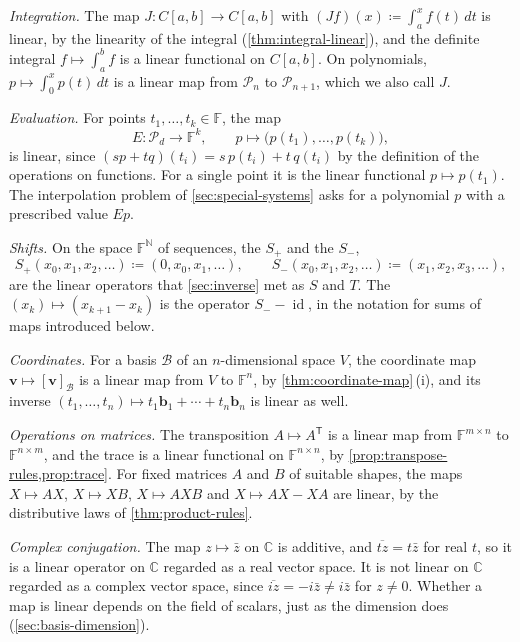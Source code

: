 \emph{Integration.} The map $J\colon C[a,b]\to C[a,b]$ with $(Jf)(x)\coloneqq\int_a^xf(t)\,dt$ is linear, by the linearity of the integral (\cref{thm:integral-linear}), and the definite integral $f\mapsto\int_a^bf$ is a linear functional on $C[a,b]$. On polynomials, $p\mapsto\int_0^xp(t)\,dt$ is a linear map from $\mathcal P_n$ to $\mathcal P_{n+1}$, which we also call $J$.

\emph{Evaluation.} For points $t_1,\ldots,t_k\in\mathbb F$, the map
\[
E\colon\mathcal P_d\to\mathbb F^k,\qquad p\mapsto\bigl(p(t_1),\ldots,p(t_k)\bigr),
\]
is linear, since $(sp+tq)(t_i)=s\,p(t_i)+t\,q(t_i)$ by the definition of the operations on functions. For a single point it is the linear functional $p\mapsto p(t_1)$. The interpolation problem of \cref{sec:special-systems} asks for a polynomial $p$ with a prescribed value $Ep$.

\emph{Shifts.} On the space $\mathbb F^{\mathbb N}$ of sequences, the  $S_+$ and the  $S_-$,
\[
S_+(x_0,x_1,x_2,\ldots)\coloneqq(0,x_0,x_1,\ldots),\qquad S_-(x_0,x_1,x_2,\ldots)\coloneqq(x_1,x_2,x_3,\ldots),
\]
are the linear operators that \cref{sec:inverse} met as $S$ and $T$. The  $(x_k)\mapsto(x_{k+1}-x_k)$ is the operator $S_--\operatorname{id}$, in the notation for sums of maps introduced below.

\emph{Coordinates.} For a basis $\mathcal B$ of an $n$-dimensional space $V$, the coordinate map $\mathbf v\mapsto[\mathbf v]_{\mathcal B}$ is a linear map from $V$ to $\mathbb F^n$, by \cref{thm:coordinate-map}\,(i), and its inverse $(t_1,\ldots,t_n)\mapsto t_1\mathbf b_1+\cdots+t_n\mathbf b_n$ is linear as well.

\emph{Operations on matrices.} The transposition $A\mapsto A^{\mathsf T}$ is a linear map from $\mathbb F^{m\times n}$ to $\mathbb F^{n\times m}$, and the trace is a linear functional on $\mathbb F^{n\times n}$, by \cref{prop:transpose-rules,prop:trace}. For fixed matrices $A$ and $B$ of suitable shapes, the maps $X\mapsto AX$, $X\mapsto XB$, $X\mapsto AXB$ and $X\mapsto AX-XA$ are linear, by the distributive laws of \cref{thm:product-rules}.

\emph{Complex conjugation.} The map $z\mapsto\bar z$ on $\mathbb C$ is additive, and $\overline{tz}=t\bar z$ for real $t$, so it is a linear operator on $\mathbb C$ regarded as a real vector space. It is not linear on $\mathbb C$ regarded as a complex vector space, since $\overline{iz}=-i\bar z\ne i\bar z$ for $z\ne0$. Whether a map is linear depends on the field of scalars, just as the dimension does (\cref{sec:basis-dimension}).

